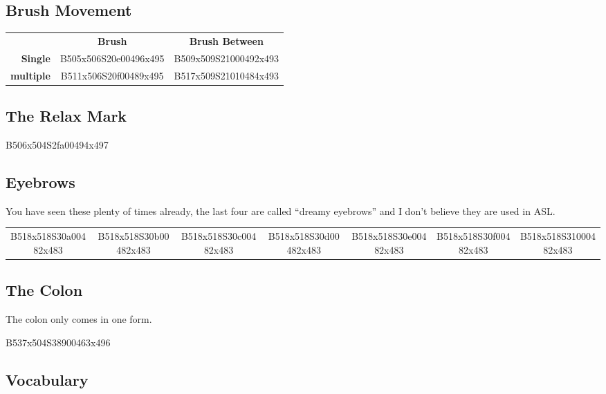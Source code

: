 \documentclass{article}
\begin{document}
\subsection{Brush Movement}

\begin{center}
\begin{tabular}{r*{2}{c}}
&\textbf{Brush}&\textbf{Brush Between}\\
\textbf{Single}  &B505x506S20e00496x495&B509x509S21000492x493\\
\textbf{multiple}&B511x506S20f00489x495&B517x509S21010484x493\\
\end{tabular}
\end{center}

\subsection{The Relax Mark}

\begin{center}
B506x504S2fa00494x497
\end{center}

\subsection{Eyebrows}

You have seen these plenty of times already, the last four are called ``dreamy eyebrows'' and I don't believe they are used in ASL.

\begin{center}
\begin{tabular}{*{7}{c}}
B518x518S30a00482x483&
B518x518S30b00482x483&
B518x518S30c00482x483&
B518x518S30d00482x483&
B518x518S30e00482x483&
B518x518S30f00482x483&
B518x518S31000482x483\\
\end{tabular}
\end{center}

\subsection{The Colon}

The colon only comes in one form.

\begin{center}
B537x504S38900463x496\\
\end{center}

\subsection{Vocabulary}
\end{document}

